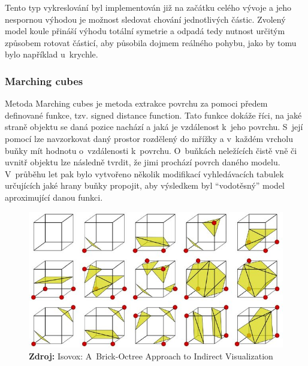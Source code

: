 Tento typ vykreslování byl implementován již na začátku celého vývoje a jeho nespornou výhodou je možnost sledovat chování jednotlivých částic. Zvolený model koule přináší výhodu totální symetrie a odpadá tedy nutnost určitým způsobem rotovat částicí, aby působila dojmem reálného pohybu, jako by tomu bylo například u~krychle.

\subsubsection{Marching cubes}
Metoda Marching cubes \cite{marchingCubes} je metoda extrakce povrchu za pomoci předem definované funkce, tzv. signed distance function. Tato funkce dokáže říci, na jaké straně objektu se daná pozice nachází a jaká je vzdálenost k~jeho povrchu. S~její pomocí lze navzorkovat daný prostor rozdělený do mřížky a v~každém vrcholu buňky mít hodnotu o~vzdálenosti k~povrchu. O~buňkách neležících čistě vně či uvnitř objektu lze následně tvrdit, že jimi prochází povrch daného modelu. V~průběhu let pak bylo vytvořeno několik modifikací vyhledávacích tabulek určujících jaké hrany buňky propojit, aby výsledkem byl \enquote{vodotěsný} model aproximující danou funkci.

\begin{figure}[hbt]
	\centering
	\captionsetup{justification=centering}
	\includegraphics[scale=0.5]{obrazky-figures/Look-up-table-for-the-Marching-Cubes-algorithm-13_W640.jpg}
	\textbf{Zdroj: } Isovox: A~Brick-Octree Approach to Indirect Visualization \cite{isovox}
	\label{fig:EvapFlow}
\end{figure}

